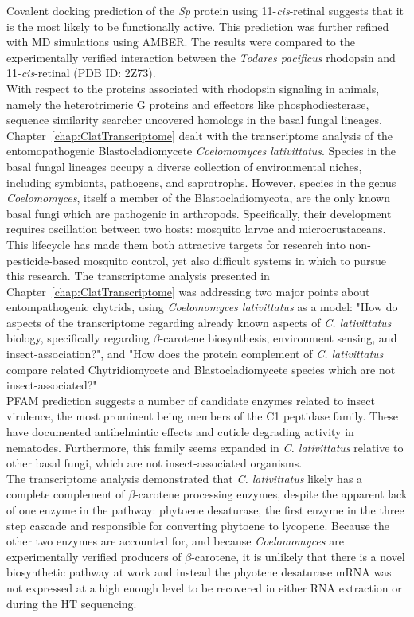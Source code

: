 \indent Covalent docking prediction of the \textit{Sp} protein using 11-\textit{cis}-retinal suggests that it is the most likely to be functionally active. This prediction was further refined with MD simulations using AMBER. The results were compared to the experimentally verified interaction between the \textit{Todares pacificus} rhodopsin and 11-\textit{cis}-retinal (PDB ID: 2Z73). \\
\indent With respect to the proteins associated with rhodopsin signaling in animals, namely the heterotrimeric G proteins and effectors like phosphodiesterase, sequence similarity searcher uncovered homologs in the basal fungal lineages. \\

\indent Chapter~\ref{chap:ClatTranscriptome} dealt with the transcriptome analysis of the entomopathogenic Blastocladiomycete \textit{Coelomomyces lativittatus}. Species in the basal fungal lineages occupy a diverse collection of environmental niches, including symbionts, pathogens, and saprotrophs. However, species in the genus \textit{Coelomomyces}, itself a member of the Blastocladiomycota, are the only known basal fungi which are pathogenic in arthropods. Specifically, their development requires oscillation between two hosts: mosquito larvae and microcrustaceans. This lifecycle has made them both attractive targets for research into non-pesticide-based mosquito control, yet also difficult systems in which to pursue this research. The transcriptome analysis presented in Chapter~\ref{chap:ClatTranscriptome} was addressing two major points about entompathogenic chytrids, using \textit{Coelomomyces lativittatus} as a model: "How do aspects of the transcriptome regarding already known aspects of \textit{C. lativittatus} biology, specifically regarding $\beta$-carotene biosynthesis, environment sensing, and insect-association?", and "How does the protein complement of \textit{C. lativittatus} compare related Chytridiomycete and Blastocladiomycete species which are not insect-associated?"\\
\indent PFAM prediction suggests a number of candidate enzymes related to insect virulence, the most prominent being members of the C1 peptidase family. These have documented antihelmintic effects and cuticle degrading activity in nematodes. Furthermore, this family seems expanded in \textit{C. lativittatus} relative to other basal fungi, which are not insect-associated organisms.\\
\indent The transcriptome analysis demonstrated that \textit{C. lativittatus} likely has a complete complement of $\beta$-carotene processing enzymes, despite the apparent lack of one enzyme in the pathway: phytoene desaturase, the first enzyme in the three step cascade and responsible for converting phytoene to lycopene. Because the other two enzymes are accounted for, and because \textit{Coelomomyces} are experimentally verified producers of $\beta$-carotene, it is unlikely that there is a novel biosynthetic pathway at work and instead the phyotene desaturase mRNA was not expressed at a high enough level to be recovered in either RNA extraction or during the HT sequencing.\\ 
